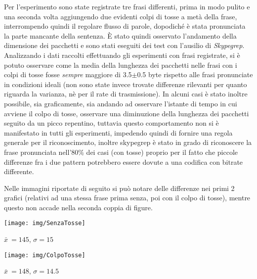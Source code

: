 Per l'esperimento sono state registrate tre frasi differenti, prima in modo pulito e una seconda volta aggiungendo due evidenti colpi di tosse a metà della frase, interrompendo quindi il regolare flusso di parole, dopodiché è stata pronunciata la parte mancante della sentenza. È stato quindi osservato l'andamento della dimensione dei pacchetti e sono stati eseguiti dei test con l'ausilio di \emph{Skypegrep}.\newline
Analizzando i dati raccolti effettuando gli esperimenti con frasi registrate, si è potuto osservare come la media della lunghezza dei pacchetti nelle frasi con i colpi di tosse fosse \emph{sempre} maggiore di 3.5$\pm$0.5 byte rispetto alle frasi pronunciate in condizioni ideali (non sono state invece trovate differenze rilevanti per quanto riguarda la varianza, nè per il rate di trasmissione).\newline
In alcuni casi è stato inoltre possibile, sia graficamente, sia andando ad osservare l'istante di tempo in cui avviene il colpo di tosse, osservare una diminuzione della lunghezza dei pacchetti seguito da un picco repentino, tuttavia questo comportamento non si è manifestato in tutti gli esperimenti, impedendo quindi di fornire una regola generale per il riconoscimento, inoltre skypegrep è stato in grado di riconoscere la frase pronunciata nell'80\% dei casi (con tosse) proprio per il fatto che piccole differenze fra i due pattern potrebbero essere dovute a una codifica con bitrate differente.\newline\newline

Nelle immagini riportate di seguito si può notare delle differenze nei primi 2 grafici (relativi ad una stessa frase prima senza, poi con il colpo di tosse), mentre questo non accade nella seconda coppia di figure.\newline
\begin{minipage}{\linewidth}
\texttt{[image: img/SenzaTosse]}
\end{minipage}
\begin{center}
$\bar x\ = 145 $, $\sigma = 15 $
\end{center}


\begin{minipage}{\linewidth}
\texttt{[image: img/ColpoTosse]}
\end{minipage}
\begin{center}
$\bar x\ = 148 $, $\sigma = 14.5 $
\end{center}


